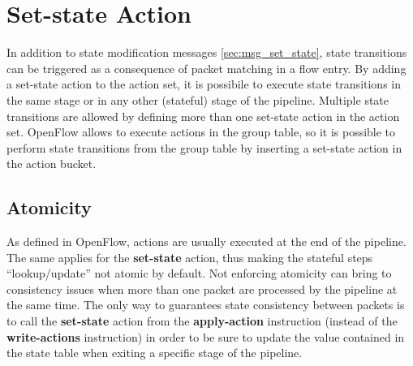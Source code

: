 
\section{Set-state Action}
\label{sec:act_set_state}
In addition to state modification messages \ref{sec:msg_set_state}, state transitions can be triggered as a consequence of packet matching in a flow entry. By adding a set-state action to the action set, it is possibile to execute state transitions in the same stage or in any other (stateful) stage of the pipeline. Multiple state transitions are allowed by defining more than one set-state action in the action set.
OpenFlow allows to execute actions in the group table, so it is possible to perform state transitions from the group table by inserting a set-state action in the action bucket.

\subsection{Atomicity}
As defined in OpenFlow, actions are usually executed at the end of the pipeline. The same applies for the \textbf{set-state} action, thus making the stateful steps ``lookup/update'' not atomic by default. Not enforcing atomicity can bring to consistency issues when more than one packet are processed by the pipeline at the same time. The only way to guarantees state consistency between packets is to call the \textbf{set-state} action from the \textbf{apply-action} instruction (instead of the \textbf{write-actions} instruction) in order to be sure to update the value contained in the state table when exiting a specific stage of the pipeline.